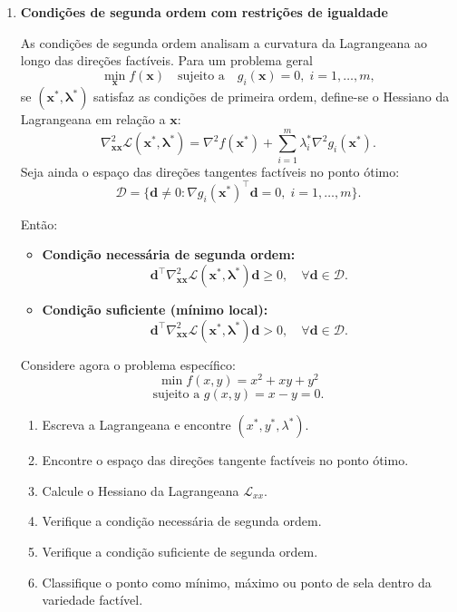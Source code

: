 \documentclass[9pt,a4paper]{extarticle}
\begin{document}
\begin{enumerate}
\item \textbf{Condições de segunda ordem com restrições de igualdade}

As condições de segunda ordem analisam a curvatura da Lagrangeana ao longo das direções factíveis.  
Para um problema geral
\[
\min_{\bm{x}} f(\bm{x})
\quad \text{sujeito a} \quad g_i(\bm{x}) = 0,\; i=1,\dots,m,
\]
se $(\bm{x}^*, \bm{\lambda}^*)$ satisfaz as condições de primeira ordem, define-se o Hessiano da Lagrangeana em relação a $\bm{x}$:
\[
\nabla^2_{\bm{x}\bm{x}} \mathcal{L}(\bm{x}^*, \bm{\lambda}^*)
= \nabla^2 f(\bm{x}^*) + \sum_{i=1}^m \lambda_i^* \nabla^2 g_i(\bm{x}^*).
\]
Seja ainda o espaço das direções tangentes factíveis no ponto ótimo:
\[
\mathcal{D} = \{\bm{d} \neq 0 : \nabla g_i(\bm{x}^*)^\top \bm{d} = 0,\; i=1,\dots,m\}.
\]

Então:
\begin{itemize}
    \item \textbf{Condição necessária de segunda ordem:}
    \[
    \bm{d}^\top \nabla^2_{\bm{x}\bm{x}} \mathcal{L}(\bm{x}^*, \bm{\lambda}^*) \bm{d} \ge 0,
    \quad \forall \bm{d} \in \mathcal{D}.
    \]
    \item \textbf{Condição suficiente (mínimo local):}
    \[
    \bm{d}^\top \nabla^2_{\bm{x}\bm{x}} \mathcal{L}(\bm{x}^*, \bm{\lambda}^*) \bm{d} > 0,
    \quad \forall \bm{d} \in \mathcal{D}.
    \]
\end{itemize}

Considere agora o problema específico:
\[
\min f(x,y)= x^2 +xy + y^2
\]
\[
\text{sujeito a } g(x,y)=x-y=0.
\]

\begin{enumerate}
    \item Escreva a Lagrangeana e encontre $(x^*,y^*,\lambda^*)$.
    \item Encontre o espaço das direções tangente factíveis no ponto ótimo.
    \item Calcule o Hessiano da Lagrangeana $\mathcal{L}_{xx}$.
    \item Verifique a condição necessária de segunda ordem.
    \item Verifique a condição suficiente de segunda ordem.
    \item Classifique o ponto como mínimo, máximo ou ponto de sela dentro da variedade factível.
\end{enumerate}

\end{enumerate}
\end{document}
